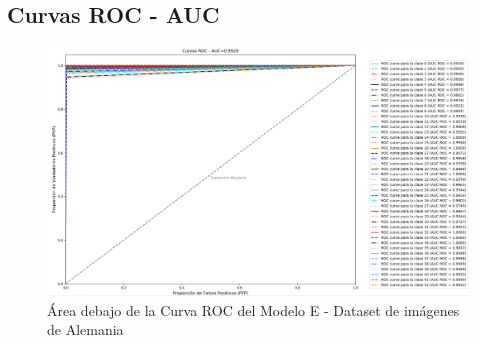 		\subsection{Curvas ROC - AUC}  
					\begin{figure}[H]
						\includegraphics[width=\textwidth,height=\textheight,keepaspectratio]{images/desarrollo/testResults/german/ROC_curve_modelE} 
						\begin{center}
						\caption{\small{Área debajo de la Curva ROC del Modelo E - Dataset de imágenes de Alemania}}
						{\small{\fontsize{10}{16.8}\selectfont {Fuente propia}}}
						\end{center}
						\vspace{-1.5em}
					\end{figure}
